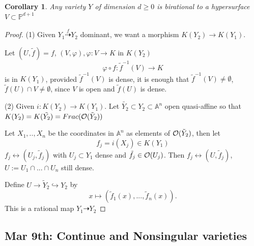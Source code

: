 \documentclass[11pt]{article}
\newtheorem{cor}[thm]{Corollary}
\newcommand{\affn}{\mathbb A}
\newcommand{\proj}{\mathbb P}
\newcommand{\calo}{{\cal O}}
\newcommand{\lrta}{\longrightarrow}
\newcommand{\llrta}{\longleftrightarrow}
\newcommand{\inj}{\hookrightarrow}
\begin{document}
\begin{cor}
Any variety $Y$ of dimension $d\geq 0$ is birational to a hypersurface $V\subset \proj^{d+1}$
\end{cor}
\begin{proof}
(1) Given $Y_1\overset{f}{\dashrightarrow}Y_2$ dominant, we want a morphism
$K(Y_2)\lrta K(Y_1)$.

 Let $(U,\tilde{f})=f$, $(V,\varphi),\varphi:V\lrta K$ in $K(Y_2)$
$$
\varphi\circ f: \tilde{f}^{-1}(V)\lrta K
$$ 
 is in $K(Y_1)$, provided $\tilde{f}^{-1}(V)$ is dense, it is enough that $\tilde{f}^{-1}(V)\neq \emptyset$, $\tilde{f}(U)\cap V\neq \emptyset$, since $V$ is open and $\tilde{f}(U)$ is dense.

 (2) Given $i: K(Y_2)\lrta K(Y_1)$. Let $\tilde{Y_2}\subset Y_2\subset \affn^n$ open quasi-affine so that $K(Y_2)=K(\tilde{Y_2})=Frac(\calo(\tilde{Y}_2))$

 Let $X_1,..,X_n$ be the coordinates  in $\affn^n$ as elements of $\calo(\tilde{Y}_2)$, then let
 $$
f_j =i (X_j)\in K(Y_1)
 $$
 $f_j\llrta (U_j,\tilde{f}_j)$ with $U_j\subset Y_1$ dense and $\tilde{f}_j\in\calo(U_j)$. Then 
 $f_j\llrta (U,\tilde{f}_j)$, $U:=U_1\cap ...\cap U_n$ still dense.

 Define $U\lrta \tilde{Y}_2\inj Y_2$ by
 $$
x\longmapsto (\tilde{f}_1(x),...,\tilde{f}_n(x)).
 $$
This is a rational map $Y_1\dashrightarrow Y_2$

\end{proof}

\subsection{Mar 9th: Continue and Nonsingular varieties}
\end{document}
